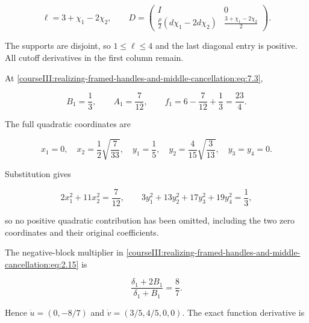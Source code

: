 \begin{equation}
\ell=3+\chi_1-2\chi_2,\qquad
 D=
 \begin{pmatrix}
 I&0\\
 \frac{\rho}{2}(d\chi_1-2d\chi_2)&
                  \frac{3+\chi_1-2\chi_2}{2}
 \end{pmatrix}.
 \label{courseIII:realizing-framed-handles-and-middle-cancellation:eq:7.4}
\end{equation}

The supports are disjoint, so \(1\leq\ell\leq4\) and the last diagonal entry is positive. All cutoff derivatives in the first column remain.

At \eqref{courseIII:realizing-framed-handles-and-middle-cancellation:eq:7.3},

\begin{equation}
B_1=\frac13,\qquad
 A_1=\frac{7}{12},\qquad
 f_1=6-\frac7{12}+\frac13=\frac{23}{4}.
 \label{courseIII:realizing-framed-handles-and-middle-cancellation:eq:7.5}
\end{equation}

The full quadratic coordinates are

\begin{equation}
x_1=0,\quad x_2=\frac12\sqrt{\frac7{33}},\quad
 y_1=\frac15,\quad y_2=\frac4{15}\sqrt{\frac3{13}},
 \quad y_3=y_4=0 .
 \label{courseIII:realizing-framed-handles-and-middle-cancellation:eq:7.6}
\end{equation}

Substitution gives

\begin{equation}
2x_1^2+11x_2^2=\frac7{12},\qquad
 3y_1^2+13y_2^2+17y_3^2+19y_4^2=\frac13,
 \label{courseIII:realizing-framed-handles-and-middle-cancellation:eq:7.7}
\end{equation}

so no positive quadratic contribution has been omitted, including the two zero coordinates and their original coefficients.

The negative-block multiplier in \eqref{courseIII:realizing-framed-handles-and-middle-cancellation:eq:2.15} is

\begin{equation}
\frac{\delta_1+2B_1}{\delta_1+B_1}
      =\frac{8}{7}.
 \label{courseIII:realizing-framed-handles-and-middle-cancellation:eq:7.8}
\end{equation}

Hence \(\dot u=(0,-8/7)\) and
\(\dot v=(3/5,4/5,0,0)\). The exact function derivative is

